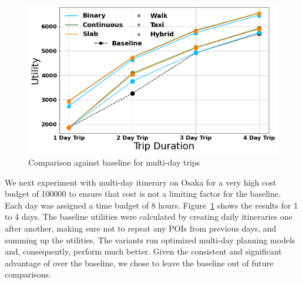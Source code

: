 \begin{figure}[t]
\includegraphics[width=\columnwidth]{plots/baseline_multiDay.png}
\caption{Comparison against baseline for multi-day trips}
\label{fig:baseline-multi}
\end{figure}

We next experiment with multi-day itinerary on Osaka for a very high cost budget of 100000 to ensure that cost is not a limiting factor for the baseline.
Each day was assigned a time budget of 8 hours.
Figure~\ref{fig:baseline-multi} shows the results for 1 to 4 days.
The baseline utilities were calculated by creating daily itineraries one after another, making sure not to repeat any POIs from previous days, and summing up the utilities.
The \trip variants run optimized multi-day planning models and, consequently, perform much better. Given the consistent and significant advantage of \trip over the baseline, we chose to leave the baseline out of future comparisons.

